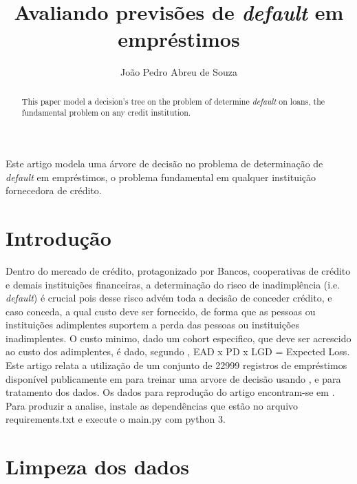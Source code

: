 \documentclass[12pt]{article}
\title{Avaliando previsões de \textit{default} em empréstimos}
\author{João Pedro Abreu de Souza\inst{1}}
\begin{document}
 

\maketitle

\begin{abstract}
  This paper model a decision's tree on the problem of determine \textit{default} on loans, the fundamental problem on any credit institution.
\end{abstract}
     
\begin{resumo} 
  Este artigo modela uma árvore de decisão no problema de determinação de \textit{default} em empréstimos, o problema fundamental em qualquer instituição fornecedora de crédito.
  
\end{resumo}


\section{Introdução}

Dentro do mercado de crédito, protagonizado por Bancos, cooperativas de crédito e demais instituições financeiras, a determinação do risco de inadimplência (i.e. \textit{default}) é crucial pois desse risco advém toda a decisão de conceder crédito, e caso conceda, a qual custo deve ser fornecido, de forma que as pessoas ou instituições adimplentes suportem a perda das pessoas ou instituições inadimplentes. O custo minimo, dado um cohort especifico, que deve ser acrescido ao custo dos adimplentes, é dado, segundo \cite{investopedia}, EAD x PD x LGD = Expected Loss. Este artigo relata a utilização de um conjunto de 22999 registros de empréstimos disponível publicamente em \cite{kaggle} para treinar uma arvore de decisão usando \cite{scikit}, \cite{pandas} e \cite{numpy} para tratamento dos dados. Os dados para reprodução do artigo encontram-se em \cite{repositorio}. Para produzir a analise, instale as dependências que estão no arquivo requirements.txt e execute o main.py com python 3.

\section{Limpeza dos dados} \label{sec:firstpage}
\end{document}
